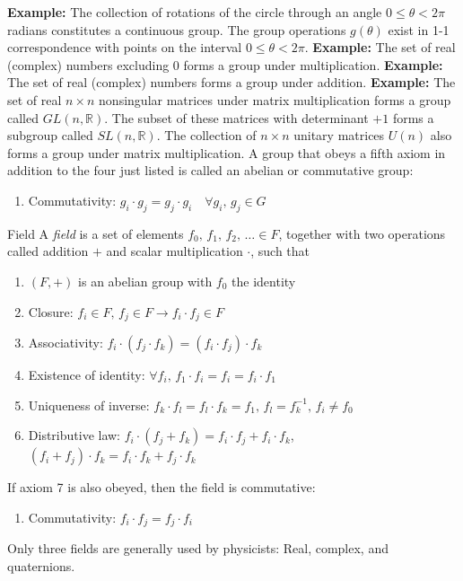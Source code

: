 \documentclass{beamer}
\begin{document}
\begin{frame}
\justify
\textbf{Example:} The collection of rotations of the circle through an angle $0\leq\theta<2\pi$ radians constitutes a continuous group. The group operations $g(\theta)$ exist in 1-1 correspondence with points on the interval $0\leq \theta < 2\pi$.
\vfill
\textbf{Example:} The set of real (complex) numbers excluding 0 forms a group under multiplication.
\vfill
\textbf{Example:} The set of real (complex) numbers forms a group under addition.
\vfill
\textbf{Example:} The set of real $n\times n$ nonsingular matrices under matrix multiplication forms a group called $GL(n,\mathbb{R})$. The subset of these matrices with determinant $+1$ forms a subgroup called $SL(n,\mathbb{R})$. The collection of $n\times n$ unitary matrices $U(n)$ also forms a group under matrix multiplication.
\vfill
A group that obeys a fifth axiom in addition to the four just listed is called an abelian or commutative group:
\begin{enumerate}
\item[5] Commutativity: $g_i \cdot g_j = g_j \cdot g_i \quad \forall g_i,\,g_j \in G$
\end{enumerate}
\end{frame}

\begin{frame}{Field}
\justify
A \textit{field} is a set of elements $f_0,\, f_1,\, f_2,\,\ldots \in F$, together with two operations called addition $+$ and scalar multiplication $\cdot$, such that
\begin{enumerate}
\item[1] $(F,+)$ is an abelian group with $f_0$ the identity
\item[2] Closure: $f_i\in F,\, f_j\in F \rightarrow f_i \cdot f_j \in F$
\item[3] Associativity: $f_i \cdot (f_j \cdot f_k) = (f_i \cdot f_j) \cdot f_k$
\item[4] Existence of identity: $\forall f_i,\, f_1 \cdot f_i = f_i = f_i \cdot f_1$
\item[5] Uniqueness of inverse: $f_k \cdot f_l = f_l \cdot f_k = f_1,\, f_l = f_k^{-1},\, f_i \neq f_0$
\item[6] Distributive law: $f_i \cdot (f_j + f_k) = f_i \cdot f_j + f_i \cdot f_k$, $(f_i + f_j) \cdot f_k = f_i \cdot f_k + f_j \cdot f_k$
\end{enumerate}
\vfill
If axiom 7 is also obeyed, then the field is commutative:
\begin{enumerate}
\item[7] Commutativity: $f_i \cdot f_j = f_j \cdot f_i$
\end{enumerate}
\vfill
Only three fields are generally used by physicists: Real, complex, and quaternions.
\end{frame}
\end{document}
